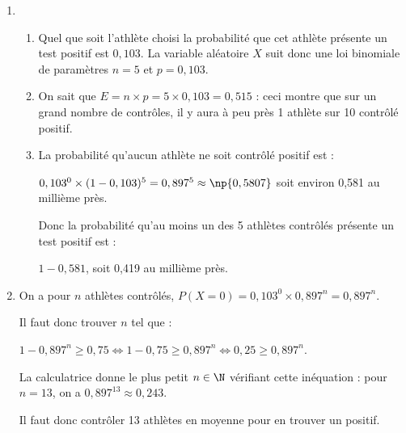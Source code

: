 \begin{enumerate}
\item %

	\begin{enumerate}
		\item %
		Quel que soit l'athlète choisi la probabilité que cet  athlète présente un test positif est $0,103$. La variable aléatoire $X$ suit donc une loi binomiale de paramètres $n = 5$ et $p = 0,103$.
		\item %
On sait que $E = n \times p = 5 \times 0,103 = 0,515$ : ceci montre que sur un grand nombre de contrôles, il y aura à peu près 1 athlète sur 10 contrôlé positif.
		\item %
La probabilité qu'aucun athlète ne soit contrôlé positif est :

$0,103^0 \times (1 - 0,103)^5 = 0,897^5 \approx \np{0,5807}$ soit environ 0,581 au millième près.

Donc la probabilité qu'au moins un des 5 athlètes contrôlés présente un test positif est :

$1 - 0,581$, soit 0,419 au millième près.
	\end{enumerate}
\item %
On a pour $n$ athlètes contrôlés, $P(X = 0) = 0,103^0 \times 0,897^n = 0,897^n$.

Il faut donc trouver $n$ tel que :

$1 - 0,897^n \geqslant 0,75 \iff 1 - 0,75 \geqslant 0,897^n \iff 0,25 \geqslant 0,897^n$.

La calculatrice donne le plus petit $n \in \N$ vérifiant cette inéquation : pour $n = 13$, on a $0,897^{13} \approx 0,243$.

Il faut donc contrôler 13 athlètes en moyenne pour en trouver un positif.
\end{enumerate}
\vspace{0,5cm}
\bigskip

